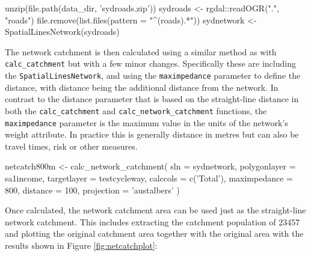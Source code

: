 \begin{Schunk}
\begin{Sinput}
unzip(file.path(data_dir, 'sydroads.zip'))
sydroads <- rgdal::readOGR(".", "roads")
file.remove(list.files(pattern = "^(roads).*"))
sydnetwork <- SpatialLinesNetwork(sydroads)
\end{Sinput}
\end{Schunk}

The network catchment is then calculated using a similar method as with
\texttt{calc\_catchment} but with a few minor changes. Specifically
these are including the \texttt{SpatialLinesNetwork}, and using the
\texttt{maximpedance} parameter to define the distance, with distance
being the additional distance from the network. In contrast to the
distance parameter that is based on the straight-line distance in both
the \texttt{calc\_catchment} and \texttt{calc\_network\_catchment}
functions, the \texttt{maximpedance} parameter is the maximum value in
the units of the network's weight attribute. In practice this is
generally distance in metres but can also be travel times, risk or other
measures.

\begin{Schunk}
\begin{Sinput}
netcatch800m <- calc_network_catchment(
  sln = sydnetwork,
  polygonlayer = sa1income,
  targetlayer = testcycleway,
  calccols = c('Total'),
  maximpedance = 800,
  distance = 100,
  projection = 'austalbers'
)
\end{Sinput}
\end{Schunk}

Once calculated, the network catchment area can be used just as the
straight-line network catchment. This includes extracting the catchment
population of 23457 and plotting the original catchment area together
with the original area with the results shown in Figure
\ref{fig:netcatchplot}:

